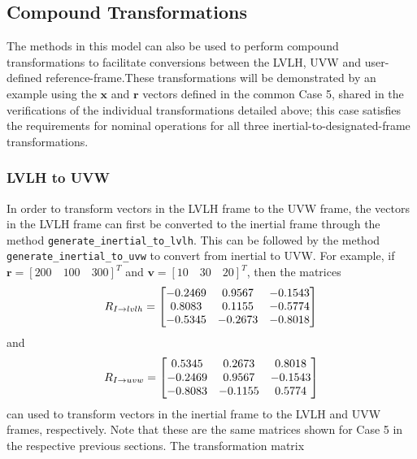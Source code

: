 \documentclass[11pt,fleqn]{report}
\begin{document}
\subsection{Compound Transformations}
The methods in this model can also be used to perform compound
transformations to facilitate conversions between the LVLH, UVW and
user-defined reference-frame.These transformations will be demonstrated
by an example using the $\textbf{x}$ and $\textbf{r}$ vectors defined in
the common Case 5, shared in the verifications of the individual
transformations detailed above; this case satisfies the requirements
for nominal operations for all three inertial-to-designated-frame
transformations.

\subsubsection{LVLH to UVW}
In order to transform vectors in the LVLH frame to the UVW frame, the vectors in
the LVLH frame can first be converted to the inertial frame through the method
\texttt{generate\_inertial\_to\_lvlh}. This can be followed by the method
\texttt{generate\_inertial\_to\_uvw} to convert from inertial to UVW.
For example,
if $\textbf{r} = [200 \quad 100 \quad 300]^T$ and
$\textbf{v} = [10 \quad 30 \quad 20]^T$,
then the matrices
\begin{equation*}
 \hfill R_{I\rightarrow lvlh} = \begin{bmatrix} -0.2469 & 0.9567 & -0.1543 \\
 0.8083 & 0.1155 & -0.5774 \\
-0.5345 & -0.2673 & -0.8018
\end{bmatrix} \hfill
\end{equation*}
and
\begin{equation*}
 \hfill R_{I\rightarrow uvw} = \begin{bmatrix} 0.5345 & 0.2673 & 0.8018 \\
-0.2469 & 0.9567 & -0.1543 \\
-0.8083 & -0.1155 & 0.5774
 \end{bmatrix} \hfill
\end{equation*}
can used to transform vectors in the inertial frame to the LVLH and UVW frames,
respectively. Note that these are the same matrices shown for Case 5 in the
respective previous sections. The transformation matrix
\end{document}
